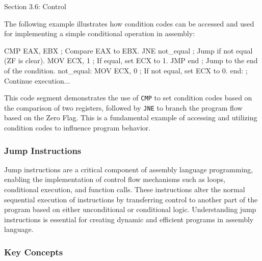 \begin{notes}{Section 3.6: Control}
    \begin{highlight}
        The following example illustrates how condition codes can be accessed and used for implementing a simple conditional operation in assembly:
    
    \begin{code}[Assembly]
        CMP EAX, EBX           ; Compare EAX to EBX.
        JNE not_equal          ; Jump if not equal (ZF is clear).
        MOV ECX, 1             ; If equal, set ECX to 1.
        JMP end                ; Jump to the end of the condition.
    not_equal:
        MOV ECX, 0             ; If not equal, set ECX to 0.
    end:
        ; Continue execution...
    \end{code}
    
        This code segment demonstrates the use of \texttt{CMP} to set condition codes based on the comparison of two registers, followed by \texttt{JNE} to branch the program flow based on the Zero 
        Flag. This is a fundamental example of accessing and utilizing condition codes to influence program behavior.
    \end{highlight}

    \subsubsection*{Jump Instructions}

    Jump instructions are a critical component of assembly language programming, enabling the implementation of control flow mechanisms such as loops, conditional execution, and function calls. These 
    instructions alter the normal sequential execution of instructions by transferring control to another part of the program based on either unconditional or conditional logic. Understanding jump 
    instructions is essential for creating dynamic and efficient programs in assembly language.
    
    \subsubsection*{Key Concepts}
    

\end{notes}
